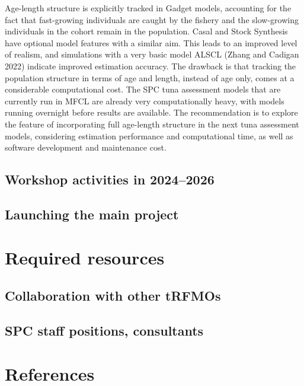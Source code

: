 \documentclass{SCreport}
\begin{document}
Age-length structure is explicitly tracked in Gadget models, accounting for the
fact that fast-growing individuals are caught by the fishery and the
slow-growing individuals in the cohort remain in the population. Casal and Stock
Synthesis have optional model features with a similar aim. This leads to an
improved level of realism, and simulations with a very basic model ALSCL (Zhang
and Cadigan 2022) indicate improved estimation accuracy. The drawback is that
tracking the population structure in terms of age and length, instead of age
only, comes at a considerable computational cost. The SPC tuna assessment models
that are currently run in MFCL are already very computationally heavy, with
models running overnight before results are available. The recommendation is to
explore the feature of incorporating full age-length structure in the next tuna
assessment models, considering estimation performance and computational time, as
well as software development and maintenance cost.

\subsection{Workshop activities in 2024--2026}

\subsection{Launching the main project}

\section{Required resources}

\subsection{Collaboration with other tRFMOs}

\subsection{SPC staff positions, consultants}

\section{References}

\sloppy\setlength{}
\end{document}
